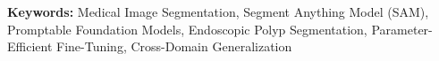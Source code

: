 \documentclass[11pt,a4paper,oneside]{report}
\begin{document}
\vspace{0.5em}
\noindent\textbf{Keywords:} Medical Image Segmentation, Segment Anything Model
(SAM), Promptable Foundation Models, Endoscopic Polyp Segmentation,
Parameter-Efficient Fine-Tuning, Cross-Domain Generalization

\renewcommand{\contentsname}{Table of Contents}
\tableofcontents

\listoffigures
{}

\listoftables
{}

\clearpage
{}
\setcounter{page}{1}









\appendix
\end{document}
